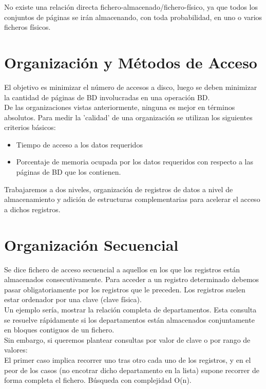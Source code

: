 \documentclass[a4paper,11pt]{article}
\begin{document}
No existe una relación directa fichero-almacenado/fichero-físico, ya que todos los conjuntos de páginas se irán almacenando, con toda probabilidad, en uno o varios ficheros físicos.

\section{Organización y Métodos de Acceso}
El objetivo es minimizar el número de accesos a disco, luego se deben minimizar la cantidad de páginas de BD involucradas en una operación BD. \\

De las organizaciones vistas anteriormente, ninguna es mejor en términos absolutos. Para medir la 'calidad' de una organización se utilizan los siguientes criterios básicos:

\begin{itemize}
\item Tiempo de acceso a los datos requeridos
\item Porcentaje de memoria ocupada por los datos requeridos con respecto a las páginas de BD que los contienen.
\end{itemize}

Trabajaremos a dos niveles, organización de registros de datos a nivel de almacenamiento y adición de estructuras complementarias para acelerar el acceso a dichos registros.

\section{Organización Secuencial}
Se dice fichero de acceso secuencial a aquellos en los que los registros están almacenados consecutivamente. Para acceder a un registro determinado debemos pasar obligatoriamente por los registros que le preceden. Los registros suelen estar ordenador por una clave (clave física). \\

Un ejemplo sería, mostrar la relación completa de departamentos. Esta consulta se resuelve rápidamente si los departamentos están almacenados conjuntamente en bloques contiguos de un fichero.\\

Sin embargo, si queremos plantear consultas por valor de clave o por rango de valores: \\

El primer caso implica recorrer uno tras otro cada uno de los registros, y en el peor de los casos (no encotrar dicho departamento en la lista) supone recorrer de forma completa el fichero. Búsqueda con complejidad O(n). \\
\end{document}
